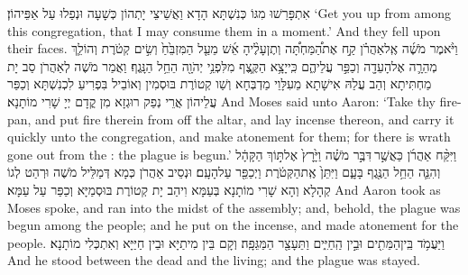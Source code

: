 {אִתְפָּרַשׁוּ מִגּוֹ כְּנִשְׁתָּא הָדָא וַאֲשֵׁיצֵי יָתְהוֹן כְּשָׁעָה וּנְפַלוּ עַל אַפֵּיהוֹן׃}
{‘Get you up from among this congregation, that I may consume them in a moment.’ And they fell upon their faces.}{}
{וַיֹּ֨אמֶר מֹשֶׁ֜ה אֶֽל\maqqaf אַהֲרֹ֗ן קַ֣ח אֶת\maqqaf הַ֠מַּחְתָּ֠ה וְתֶן\maqqaf עָלֶ֨יהָ אֵ֜שׁ מֵעַ֤ל הַמִּזְבֵּ֙חַ֙ וְשִׂ֣ים קְטֹ֔רֶת וְהוֹלֵ֧ךְ מְהֵרָ֛ה אֶל\maqqaf הָעֵדָ֖ה וְכַפֵּ֣ר עֲלֵיהֶ֑ם כִּֽי\maqqaf יָצָ֥א הַקֶּ֛צֶף מִלִּפְנֵ֥י יְהֹוָ֖ה הֵחֵ֥ל הַנָּֽגֶף׃}
{וַאֲמַר מֹשֶׁה לְאַהֲרֹן סַב יָת מַחְתִּיתָא וְהַב עֲלַהּ אִישָׁתָא מֵעִלָּוֵי מַדְבְּחָא וְשַׁו קְטוֹרֶת בּוּסְמִין וְאוֹבֵיל בִּפְרִיעַ לִכְנִשְׁתָּא וְכַפַּר עֲלֵיהוֹן אֲרֵי נְפַק רוּגְזָא מִן קֳדָם יְיָ שָׁרִי מוֹתָנָא׃}
{And Moses said unto Aaron: ‘Take thy fire-pan, and put fire therein from off the altar, and lay incense thereon, and carry it quickly unto the congregation, and make atonement for them; for there is wrath gone out from the \lord: the plague is begun.’}{}
{וַיִּקַּ֨ח אַהֲרֹ֜ן כַּאֲשֶׁ֣ר \legarmeh  דִּבֶּ֣ר מֹשֶׁ֗ה וַיָּ֙רׇץ֙ אֶל\maqqaf תּ֣וֹךְ הַקָּהָ֔ל וְהִנֵּ֛ה הֵחֵ֥ל הַנֶּ֖גֶף בָּעָ֑ם וַיִּתֵּן֙ אֶֽת\maqqaf הַקְּטֹ֔רֶת וַיְכַפֵּ֖ר עַל\maqqaf הָעָֽם׃}
{וּנְסֵיב אַהֲרֹן כְּמָא דְּמַלֵּיל מֹשֶׁה וּרְהַט לְגוֹ קְהָלָא וְהָא שָׁרִי מוֹתָנָא בְּעַמָּא וִיהַב יָת קְטוֹרֶת בּוּסְמַיָּא וְכַפַּר עַל עַמָּא׃}
{And Aaron took as Moses spoke, and ran into the midst of the assembly; and, behold, the plague was begun among the people; and he put on the incense, and made atonement for the people.}{}
{וַיַּעֲמֹ֥ד בֵּֽין\maqqaf הַמֵּתִ֖ים וּבֵ֣ין הַֽחַיִּ֑ים וַתֵּעָצַ֖ר הַמַּגֵּפָֽה׃}
{וְקָם בֵּין מִיתַיָּא וּבֵין חַיַּיָּא וְאִתְכְּלִי מוֹתָנָא׃}
{And he stood between the dead and the living; and the plague was stayed.}{}
